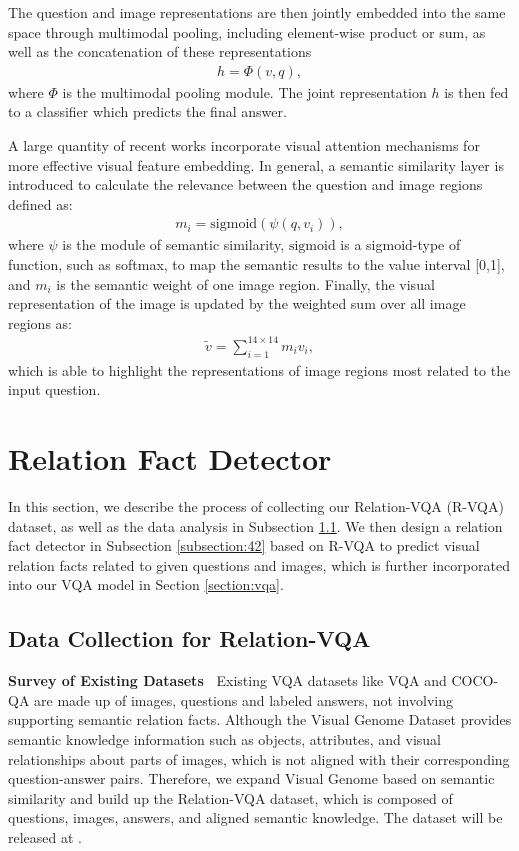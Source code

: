 \documentclass[sigconf]{acmart}
\begin{document}
The question and image representations are then jointly embedded into the same space through multimodal pooling, including element-wise product or sum, as well as the concatenation of these representations
\begin{align}
	h = \Phi(v, q) ,
\end{align}
where $\Phi$ is the multimodal pooling module. The joint representation $h$ is then fed to a classifier which predicts the final answer.


A large quantity of recent works incorporate visual attention mechanisms for more effective visual feature embedding. In general, a semantic similarity layer is introduced to calculate the relevance between the question and image regions defined as:
\begin{align}
	m_i = \mathrm{sigmoid}( \psi(q, v_i)) ,
\end{align}
where $\psi$ is the module of semantic similarity, $\mathrm{sigmoid}$ is a sigmoid-type of function, such as softmax, to map the semantic results to the value interval [0,1], and $m_i$ is the semantic weight of one image region. Finally, the visual representation of the image is updated by the weighted sum over all image regions as:
\begin{align}
	\tilde{v} =\sum_{i=1}^{14\times14} m_i v_i ,
\end{align}
which is able to highlight the representations of image regions most related to the input question.

\section{Relation Fact Detector} \label{section:4} 
In this section, we describe the process of collecting our Relation-VQA (R-VQA) dataset,
as well as the data analysis in Subsection \ref{subsection:41}.
We then design a relation fact detector in Subsection \ref{subsection:42} based on R-VQA to predict
visual relation facts related to given questions and images,
which is further incorporated into our VQA model in Section \ref{section:vqa}.





\subsection{Data Collection for Relation-VQA} \label{subsection:41} 
\textbf{Survey of Existing Datasets~} Existing VQA datasets like VQA \cite{antol2015vqa} and COCO-QA \cite{ren2015exploring}
are made up of images, questions and labeled answers, not involving supporting semantic relation facts.
Although the Visual Genome Dataset \cite{krishna2017visual} provides semantic knowledge information such as objects,
attributes, and visual relationships about parts of images, which is not aligned with their corresponding question-answer pairs.
Therefore, we expand Visual Genome based on semantic similarity and build up the Relation-VQA dataset,
which is composed of questions, images, answers, and aligned semantic knowledge. 
The dataset will be released at 
{
}\!.  
\end{document}
